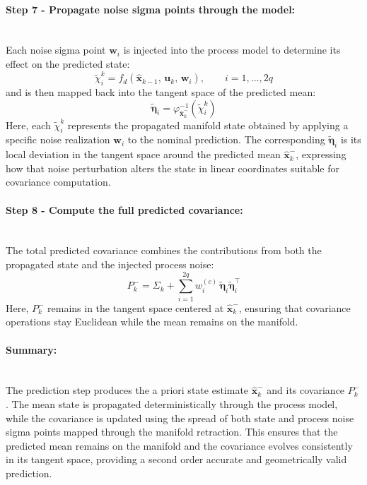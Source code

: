\paragraph{Step 7 - Propagate noise sigma points through the model:} \mbox{}\\[0.5em] \noindent
Each noise sigma point $\mathbf{w}_i$ is injected into the process model to determine its effect on the predicted state:
$$
    \tilde{\chi}_i^{k} = f_d(\hat{\mathbf{x}}_{k-1},\, \mathbf{u}_k,\, \mathbf{w}_i),\qquad i = 1,\ldots,2q
$$
and is then mapped back into the tangent space of the predicted mean:
$$
    \tilde{\boldsymbol{\eta}}_i = \varphi^{-1}_{\hat{\mathbf{x}}_{k}^{-}}(\tilde{\chi}_i^{k})
$$
Here, each $\tilde{\chi}_i^{k}$ represents the propagated manifold state obtained by applying a specific noise realization $\mathbf{w}_i$ to the nominal prediction. The corresponding $\tilde{\boldsymbol{\eta}}_i$ is its local deviation in the tangent space around the predicted mean $\hat{\mathbf{x}}_{k}^{-}$, expressing how that noise perturbation alters the state in linear coordinates suitable for covariance computation.

\paragraph{Step 8 - Compute the full predicted covariance:} \mbox{}\\[0.5em] \noindent
The total predicted covariance combines the contributions from both the propagated state and the injected process noise:
$$
    P_k^{-} = \Sigma_k + \sum_{i=1}^{2q} w_i^{(c)}\, \tilde{\boldsymbol{\eta}}_i \tilde{\boldsymbol{\eta}}_i^\top
$$
Here, $P_k^{-}$ remains in the tangent space centered at $\hat{\mathbf{x}}_{k}^{-}$, ensuring that covariance operations stay Euclidean while the mean remains on the manifold.

\paragraph{Summary:} \mbox{}\\[0.5em] \noindent
The prediction step produces the a priori state estimate $\hat{\mathbf{x}}_{k}^{-}$ and its covariance $P_{k}^{-}$. The mean state is propagated deterministically through the process model, while the covariance is updated using the spread of both state and process noise sigma points mapped through the manifold retraction. This ensures that the predicted mean remains on the manifold and the covariance evolves consistently in its tangent space, providing a second order accurate and geometrically valid prediction.



